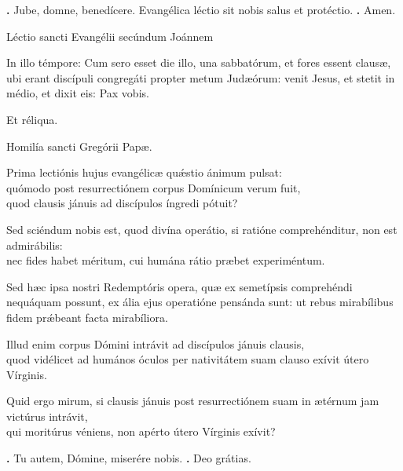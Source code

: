 \begin{small}
\textbf{\Vbar.} Jube, domne, benedícere.
Evangélica léctio sit nobis salus et protéctio. \textbf{\Rbar.} Amen.
\end{small}


Léctio sancti Evangélii secúndum Joánnem

In illo témpore: 
Cum sero esset die illo, una sabbatórum, et fores essent clausæ, 
ubi erant discípuli congregáti propter metum Judæórum: 
venit Jesus, et stetit in médio, et dixit eis: Pax vobis. 

Et réliqua.

Homilía sancti Gregórii Papæ.

Prima lectiónis hujus evangélicæ qu\'{\ae}stio ánimum pulsat: \\
quómodo post resurrectiónem corpus Domínicum verum fuit, \\
quod clausis jánuis ad discípulos íngredi pótuit? 

Sed sciéndum nobis est, quod divína operátio, si ratióne comprehénditur, non est admirábilis: \\
nec fides habet méritum, cui humána rátio præbet experiméntum. 

Sed hæc ipsa nostri Redemptóris opera, quæ ex semetípsis comprehéndi nequáquam possunt, 
ex ália ejus operatióne pensánda sunt: 
ut rebus mirabílibus fidem pr\'{\ae}beant facta mirabíliora. 

Illud enim corpus Dómini intrávit ad discípulos jánuis clausis, \\
quod vidélicet ad humános óculos per nativitátem suam clauso exívit útero Vírginis. 

Quid ergo mirum, si clausis jánuis post resurrectiónem suam in ætérnum jam victúrus intrávit, \\
qui moritúrus véniens, non apérto útero Vírginis exívit?

\textbf{\Vbar.} Tu autem, Dómine, miserére nobis.
\textbf{\Rbar.} Deo grátias.

